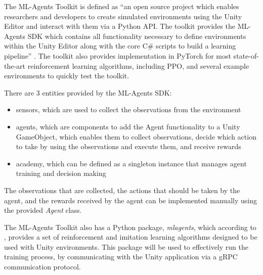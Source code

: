 The ML-Agents Toolkit is defined as \enquote{an open source project which enables researchers and developers to create simulated environments using the Unity Editor and interact with them via a Python API. The toolkit provides the ML-Agents SDK which contains all functionality necessary to define environments within the Unity Editor along with the core C\# scripts to build a learning pipeline} \cite{juliani2020unityai}. The toolkit also provides implementation in PyTorch for most state-of-the-art reinforcement learning algorithms, including PPO, and several example environments to quickly test the toolkit.

There are 3 entities provided by the ML-Agents SDK:
\begin{itemize}
    \item sensors, which are used to collect the observations from the environment
    \item agents, which are components to add the Agent functionality to a Unity GameObject, which enables them to collect observations, decide which action to take by using the observations and execute them, and receive rewards
    \item academy, which can be defined as a singleton instance that manages agent training and decision making \cite{mlagents_api_docs}
\end{itemize}

The observations that are collected, the actions that should be taken by the agent, and the rewards received by the agent can be implemented manually using the provided \emph{Agent} class.

The ML-Agents Toolkit also has a Python package, \emph{mlagents}, which according to \cite{mlagents_pypi}, provides a set of reinforcement and imitation learning algorithms designed to be used with Unity environments. This package will be used to effectively run the training process, by communicating with the Unity application via a gRPC communication protocol.


